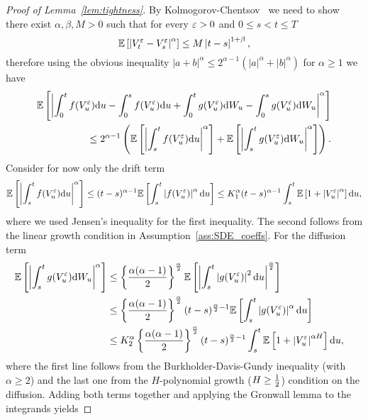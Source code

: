 \begin{proof}[Proof of Lemma~\ref{lem:tightness}]
By Kolmogorov-Chentsov~\cite[Theorem 21.42]{Klenke2014ProbabilityTheory} we need to show there exist $\alpha, \beta, M > 0$ such that for every $\varepsilon >0$ and $0\leq s < t \leq T$
\[
\mathbb{E}\left[\left\vert V_t^\varepsilon - V_s^\varepsilon\right\vert^\alpha\right] \leq M \left\vert t - s\right\vert^{1+\beta},
\]
therefore using the obvious inequality 
$|a+b|^{\alpha} \leq 2^{\alpha-1}\left(|a|^{\alpha}+|b|^{\alpha}\right)$ for $\alpha\geq1$ we have
\begin{align*}
\mathbb{E}\left[ \left\vert \int_0^t f(V_u^\varepsilon)\mathrm{d} u - \int_0^s f(V_u^\varepsilon)\mathrm{d} u + \int_0^t g(V_u^\varepsilon)\mathrm{d} W_u - \int_0^s g(V_u^\varepsilon)\mathrm{d} W_u \right \vert^\alpha \right ] \\ \leq 2^{\alpha-1} \left( \mathbb{E}\left[ \left\vert  \int_s^t f(V_u^\varepsilon) \mathrm{d} u \right\vert^\alpha \right ] + \mathbb{E}\left[ \left\vert  \int_s^t g(V_u ^\varepsilon) \mathrm{d} W_u \right\vert^\alpha \right] \right).
\end{align*}
Consider for now only the drift term
$$
\mathbb{E}\left[ \left\vert  \int_s^t f(V_u^\varepsilon) \mathrm{d} u \right\vert^\alpha \right ]
\leq (t-s)^{\alpha-1}\mathbb{E}\left[ \int_s^t \left\vert f(V_u^\varepsilon)\right\vert^\alpha \mathrm{d} u  \right ]
\leq K_1^\alpha(t-s)^{\alpha-1}\int_s^t \mathbb{E}\left[ 1 + \left\vert V_u^\varepsilon\right\vert^\alpha \right]\mathrm{d} u,
$$
where we used Jensen's inequality for the first inequality. 
The second follows from the linear growth condition in Assumption~\ref{ass:SDE_coeffs}. For the diffusion term
\begin{align*}
\EE\left[ \left\vert  \int_s^t g(V_u ^\eps) \D W_u \right\vert^\alpha \right] 
&\leq \left\{\frac{\alpha(\alpha-1)}{2}\right\}^{\frac{\alpha}{2}} \EE\left[ \left\vert  \int_s^t \left\vert g(V_u ^\eps)\right\vert^{2} \D u \right\vert^{\frac{\alpha}{2}} \right]\\
&\leq \left\{\frac{\alpha(\alpha-1)}{2}\right\}^{\frac{\alpha}{2}} (t-s)^{\frac{\alpha}{2}-1} \EE\left[\int_s^t \left\vert g(V_u ^\eps)\right\vert^{\alpha} \D u  \right] & %
\\
&\leq K_2^\alpha \left\{\frac{\alpha(\alpha-1)}{2}\right\}^{\frac{\alpha}{2}} (t-s)^{\frac{\alpha}{2}-1} \int_s^t \EE\left[1 +  \left\vert V_u^\eps\right\vert^{\alpha H} \right] \D u,
\end{align*}
where the first line follows from the Burkholder-Davis-Gundy inequality (with $\alpha\geq 2$) and the last one from the 
$H$-polynomial growth ($H\geq \frac{1}{2}$) condition on the diffusion. 
Adding both terms together and applying the Gronwall lemma to the integrands yields

\end{proof}
